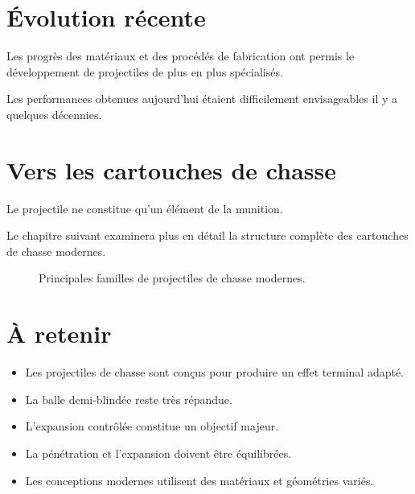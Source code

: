 \section{Évolution récente}

Les progrès des matériaux et des procédés de fabrication ont permis le
développement de projectiles de plus en plus spécialisés.

Les performances obtenues aujourd'hui étaient difficilement envisageables il y
a quelques décennies.

\section{Vers les cartouches de chasse}

Le projectile ne constitue qu'un élément de la munition.

Le chapitre suivant examinera plus en détail la structure complète des
cartouches de chasse modernes.

\begin{figure}[htbp]
\centering


\caption{Principales familles de projectiles de chasse modernes.}
\label{fig:familles_projectiles_chasse}

\end{figure}

\section{À retenir}

\begin{aretenir}

\begin{itemize}
    \item Les projectiles de chasse sont conçus pour produire un effet terminal
          adapté.
    \item La balle demi-blindée reste très répandue.
    \item L'expansion contrôlée constitue un objectif majeur.
    \item La pénétration et l'expansion doivent être équilibrées.
    \item Les conceptions modernes utilisent des matériaux et géométries
          variés.
\end{itemize}

\end{aretenir}
